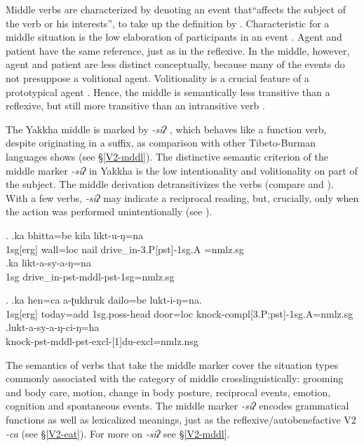 Middle verbs are characterized by denoting an event that“affects the subject of the verb or his interests”, to take up the definition by \citet[373]{Lyons1969_Introduction}. Characteristic for a middle situation is the low elaboration of participants in an event \citep[3]{Kemmer1993_Middle}. Agent and patient have the same reference, just as in the reflexive. In the middle, however, agent and patient are less distinct conceptually, because many of the events do not presuppose a volitional agent. Volitionality is a crucial feature of a prototypical agent \citep{Hopperetal1980Transitivity, Foleyetal1984Functional}. Hence, the middle is semantically less transitive than a reflexive, but still more transitive than an intransitive verb  \citep[73]{Kemmer1993_Middle}. 

The Yakkha middle is marked by \emph{-siʔ} , which behaves like a function verb, despite originating in a suffix, as comparison with other Tibeto-Burman languages shows (see §\ref{V2-mddl}). The distinctive semantic criterion of the middle marker \emph{-siʔ} in Yakkha is the low intentionality and volitionality  on part of  the subject. The middle derivation detransitivizes the verbs (compare \Next[a] and \Next[b]). With a few verbs, \emph{-siʔ} may indicate a reciprocal reading, but, crucially, only when the action was performed unintentionally (see \NNext).

\ex. \ag.ka bhitta=be kila likt-u-ŋ=na\\
		{\sc 1sg[erg]} wall{\sc =loc} nail 	drive\_in-{\sc 3.P[pst]-1sg.A =nmlz.sg}	\\
 	\bg.ka  likt-a-sy-a-ŋ=na\\
		{\sc 1sg}  drive\_in{\sc -pst-mddl-pst-1sg=nmlz.sg} 		\\


\ex. \ag.ka hen=ca a-ʈukhruk dailo=be lukt-i-ŋ=na.\\
		{\sc 1sg[erg]} today{\sc =add} {\sc 1sg.poss}-head door{\sc =loc} knock{\sc -compl[3.P;pst]-1sg.A=nmlz.sg} \\
 	\bg.lukt-a-sy-a-ŋ-ci-ŋ=ha\\
	knock-{\sc pst-mddl-pst-excl-[1]du-excl=nmlz.nsg}	\\


The semantics of verbs that take the middle marker cover the situation types commonly associated with the category of middle crosslinguistically: grooming and body care, motion, change in body posture, reciprocal events, emotion, cognition and spontaneous events. The middle marker \emph{-siʔ} encodes grammatical functions as well as lexicalized meanings, just as the reflexive/autobenefactive V2 \emph{-ca} (see §\ref{V2-eat}). For more on  \emph{-siʔ} see §\ref{V2-mddl}.


